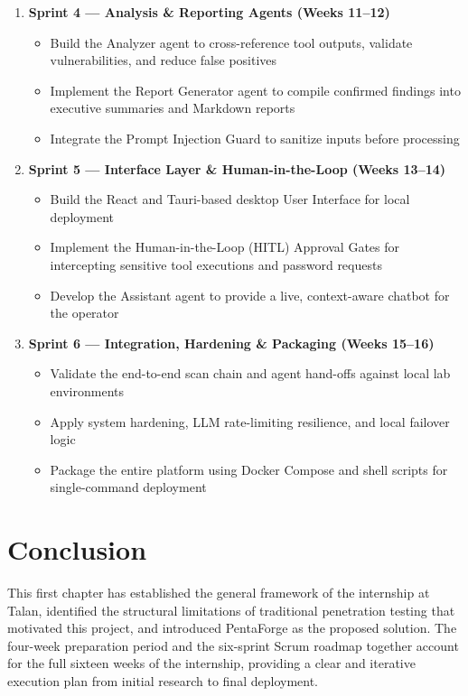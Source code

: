 \documentclass[12pt,a4paper]{report}
\begin{document}
\begin{enumerate}
    \item \textbf{Sprint 4 --- Analysis \& Reporting Agents (Weeks 11--12)}
    \begin{itemize}
        \item Build the Analyzer agent to cross-reference tool outputs, validate
        vulnerabilities, and reduce false positives
        \item Implement the Report Generator agent to compile confirmed findings
        into executive summaries and Markdown reports
        \item Integrate the Prompt Injection Guard to sanitize inputs before processing
    \end{itemize}

    \item \textbf{Sprint 5 --- Interface Layer \& Human-in-the-Loop (Weeks 13--14)}
    \begin{itemize}
        \item Build the React and Tauri-based desktop User Interface for local deployment
        \item Implement the Human-in-the-Loop (HITL) Approval Gates for intercepting
        sensitive tool executions and password requests
        \item Develop the Assistant agent to provide a live, context-aware chatbot
        for the operator
    \end{itemize}

    \item \textbf{Sprint 6 --- Integration, Hardening \& Packaging (Weeks 15--16)}
    \begin{itemize}
        \item Validate the end-to-end scan chain and agent hand-offs against local
        lab environments
        \item Apply system hardening, LLM rate-limiting resilience, and local
        failover logic
        \item Package the entire platform using Docker Compose and shell scripts
        for single-command deployment
    \end{itemize}
\end{enumerate}

\section{Conclusion}

This first chapter has established the general framework of the internship at Talan,
identified the structural limitations of traditional penetration testing that motivated
this project, and introduced PentaForge as the proposed solution. The four-week
preparation period and the six-sprint Scrum roadmap together account for the full
sixteen weeks of the internship, providing a clear and iterative execution plan from
initial research to final deployment.
\end{document}
